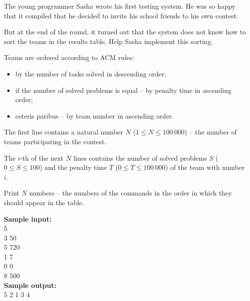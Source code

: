 \documentclass[a4paper]{article}
\begin{document}
The young programmer Sasha wrote his first testing system. He was so happy that it compiled that he decided to invite his school friends to his own contest.

But at the end of the round, it turned out that the system does not know how to sort the teams in the results table. Help Sasha implement this sorting.

Teams are ordered according to ACM rules:
\begin{itemize}
\item by the number of tasks solved in descending order;
\item if the number of solved problems is equal -- by penalty time in ascending order;
\item ceteris paribus -- by team number in ascending order.
\end{itemize}

The first line contains a natural number $N$ ($1 \le N \le 100 \ 000$) -- the number of teams participating in the contest.

The $i$-th of the next $N$ lines contains the number of solved problems $S$ ($0 \le S \le 100$) and the penalty time $T$ ($0 \le T \le 100 \ 000$) of the team with number $i$.

Print $N$ numbers -- the numbers of the commands in the order in which they should appear in the table.

\LINE

\noindent \textbf{Sample input:}\\
5\\
3 50\\
5 720\\
1 7\\
0 0\\
8 500\\


\noindent \textbf{Sample output:}\\
5 2 1 3 4
\end{document}
